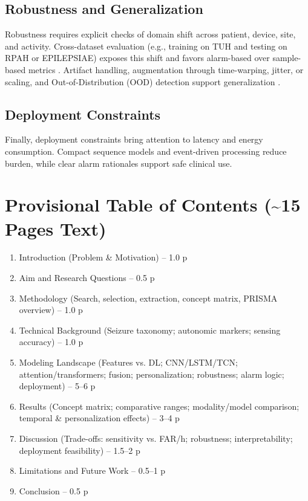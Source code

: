 \subsection{Robustness and Generalization}
Robustness requires explicit checks of domain shift across patient,
device, site, and activity. Cross-dataset evaluation (e.g., training
on TUH and testing on RPAH or EPILEPSIAE) exposes this shift and favors
alarm-based over sample-based metrics
\parencite{yangMultimodalAISystem2022,andradePerformanceSeizurePrediction2024}.
Artifact handling, augmentation through time-warping, jitter, or
scaling, and Out-of-Distribution (OOD) detection support
generalization \parencite{kalousiosECGbasedEpilepticSeizure2024,
sethFeasibilityCardiacbasedSeizure2023}.

\subsection{Deployment Constraints}
Finally, deployment constraints bring attention to latency and energy
consumption. Compact sequence models and event-driven processing
reduce burden, while clear alarm rationales support safe clinical use.

\section*{Provisional Table of Contents (\textasciitilde15 Pages Text)}
\begin{enumerate}
  \item Introduction (Problem \& Motivation) -- 1.0 p
  \item Aim and Research Questions -- 0.5 p
  \item Methodology (Search, selection, extraction, concept matrix,
    PRISMA overview) -- 1.0 p
  \item Technical Background (Seizure taxonomy; autonomic markers;
    sensing accuracy) -- 1.0 p
  \item Modeling Landscape (Features vs. DL; CNN/LSTM/TCN;
    attention/transformers; fusion; personalization; robustness; alarm
    logic; deployment) -- 5--6 p
  \item Results (Concept matrix; comparative ranges; modality/model
    comparison; temporal \& personalization effects) -- 3--4 p
  \item Discussion (Trade-offs: sensitivity vs. FAR/h; robustness;
    interpretability; deployment feasibility) -- 1.5--2 p
  \item Limitations and Future Work -- 0.5--1 p
  \item Conclusion -- 0.5 p
\end{enumerate}